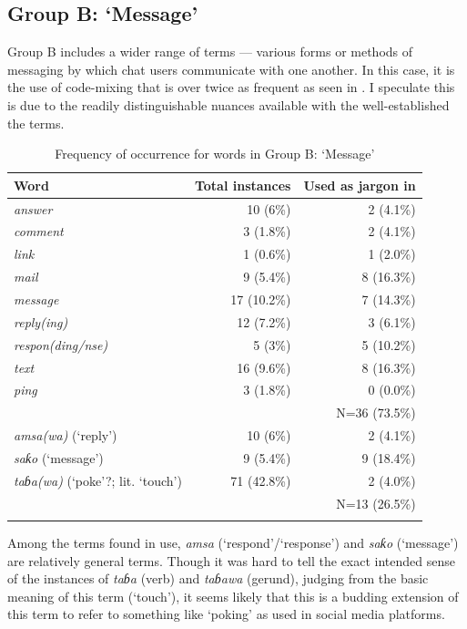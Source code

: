 \documentclass[output=paper
,newtxmath
,modfonts
,nonflat]{langsci/langscibook}
\begin{document}
\subsection{Group B: ‘Message’}

Group B includes a wider range of terms — various forms or methods of messaging by which chat users communicate with one another. In this case, it is the use of  code-mixing that is over twice as frequent as seen in . I speculate this is due to the readily distinguishable nuances available with the well-established the  terms. 

\begin{table}
\begin{tabularx}{\textwidth}{Qrr}
\lsptoprule
Word & Total instances & Used as jargon in \\
\midrule
\textit{answer}           & 10 (6\%)  & 2 (4.1\%)\\
\textit{comment}          & 3 (1.8\%) & 2 (4.1\%)\\
\textit{link}             & 1 (0.6\%) & 1 (2.0\%)\\
\textit{mail}             & 9 (5.4\%) & 8 (16.3\%)\\
\textit{message}          & 17 (10.2\%) & 7 (14.3\%)\\
\textit{reply(ing)}       & 12 (7.2\%) & 3 (6.1\%)\\
\textit{respon(ding/nse)} & 5 (3\%) & 5 (10.2\%)\\
\textit{text}             & 16 (9.6\%) & 8 (16.3\%)\\
\textit{ping}             & 3 (1.8\%) & 0 (0.0\%)\\\midrule
& & N=36 (73.5\%)\\\midrule
\textit{amsa(wa)} (‘reply’)                & 10 (6\%) & 2 (4.1\%)\\
\textit{saƙo} (‘message’)                  & 9 (5.4\%) & 9 (18.4\%)\\
\textit{taɓa(wa)} (‘poke’?; lit. ‘touch’) & 71 (42.8\%) & 2 (4.0\%)\\\midrule
& & N=13 (26.5\%)\\
\lspbottomrule
\end{tabularx} 
\caption{Frequency of occurrence for words in Group B: ‘Message’}
\label{tab:purvis:4}
\end{table} 

Among the  terms found in use, \textit{amsa} (‘respond’/‘response’) and \textit{saƙo} (‘message’) are relatively general terms. Though it was hard to tell the exact intended sense of the instances of \textit{taɓa} (verb) and \textit{taɓawa} (gerund), judging from the basic meaning of this term (‘touch’), it seems likely that this is a budding extension of this term to refer to something like ‘poking’ as used in social media platforms. 
\end{document}
